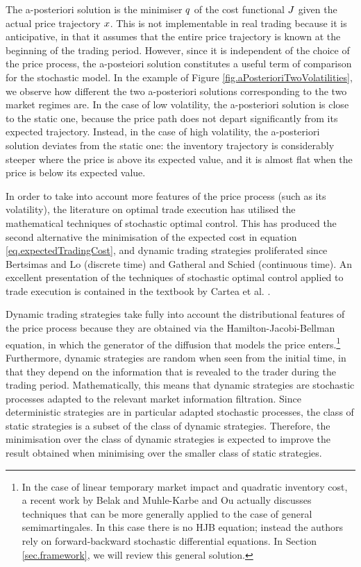 \documentclass[10pt,a4paper]{article}
\begin{document}
	The a-posteriori solution  is the minimiser $q$ of the cost functional $J$ given the actual price trajectory $x$. This is not implementable in real trading because it is anticipative, in that it assumes that the entire price trajectory is known at the beginning of the trading period. However, since it is independent of the choice of the price process,  the a-posteiori solution constitutes a useful term of comparison for the stochastic model. In the example of Figure \ref{fig.aPosterioriTwoVolatilities}, we observe how different the two  a-posteriori solutions corresponding to the two market regimes are. In the case of low volatility, the a-posteriori solution is close to the static one, because the price path does not depart significantly from its expected trajectory. Instead, in the case of high volatility,  the a-posteriori solution deviates from the static one: the inventory trajectory is considerably steeper where the price is above its expected value, and it is almost flat when the price is below its expected value. 
	
	
	In order to take into account more features of the price process (such as its volatility), the literature on optimal trade execution has utilised the mathematical techniques of stochastic optimal control. This has produced the second alternative the minimisation of the expected cost in equation \eqref{eq.expectedTradingCost}, and dynamic trading strategies proliferated since Bertsimas and Lo \cite{BL98opt} (discrete time) and  Gatheral and Schied \cite{GS11opt} (continuous time). An excellent presentation of the techniques of stochastic optimal control applied to trade execution is contained in the textbook by  Cartea et al. \cite{CJP15alg}. 
	
	Dynamic trading strategies take fully into account the distributional features of the price process because they are obtained via the Hamilton-Jacobi-Bellman equation, in which the generator of the diffusion that models the price enters.\footnote{In the case of linear temporary market impact and quadratic inventory cost, a recent work by Belak and Muhle-Karbe and Ou \cite{BMO18opt} actually discusses techniques that can be more generally applied to the case of general semimartingales. In this case there is no HJB equation; instead the authors rely on forward-backward stochastic differential equations. In Section \ref{sec.framework}, we will review this general solution.}
	Furthermore, dynamic strategies are  random when seen from the initial time, in that they depend   on the information that is revealed to the trader during the trading period. Mathematically, this means that dynamic strategies are stochastic processes adapted to the relevant market information filtration.  Since deterministic strategies are in particular adapted stochastic processes, the class of static strategies is a subset of the class of dynamic strategies. Therefore, the minimisation  over the class of dynamic strategies is expected to improve the result obtained when minimising over the smaller class of  static strategies.  
	
\end{document}
